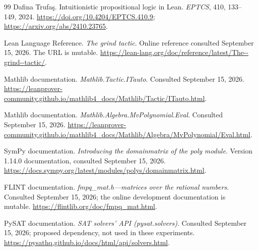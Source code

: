 \begin{thebibliography}{99}
Dafina Trufa\c{s}. Intuitionistic propositional logic in Lean.
\emph{EPTCS}, 410, 133--149, 2024.
\url{https://doi.org/10.4204/EPTCS.410.9};
\url{https://arxiv.org/abs/2410.23765}.

Lean Language Reference. \emph{The grind tactic}. Online reference consulted
September 15, 2026. The  URL is mutable.
\url{https://lean-lang.org/doc/reference/latest/The--grind--tactic/}.

Mathlib documentation. \emph{Mathlib.Tactic.ITauto}.
Consulted September 15, 2026.
\url{https://leanprover-community.github.io/mathlib4_docs/Mathlib/Tactic/ITauto.html}.

Mathlib documentation. \emph{Mathlib.Algebra.MvPolynomial.Eval}.
Consulted September 15, 2026.
\url{https://leanprover-community.github.io/mathlib4_docs/Mathlib/Algebra/MvPolynomial/Eval.html}.

SymPy documentation. \emph{Introducing the domainmatrix of the poly module}.
Version 1.14.0 documentation, consulted September 15, 2026.
\url{https://docs.sympy.org/latest/modules/polys/domainmatrix.html}.

FLINT documentation. \emph{fmpq\_mat.h---matrices over the rational numbers}.
Consulted September 15, 2026; the online development documentation is mutable.
\url{https://flintlib.org/doc/fmpq_mat.html}.

PySAT documentation. \emph{SAT solvers' API (pysat.solvers)}.
Consulted September 15, 2026; proposed dependency, not used in these experiments.
\url{https://pysathq.github.io/docs/html/api/solvers.html}.
\end{thebibliography}
